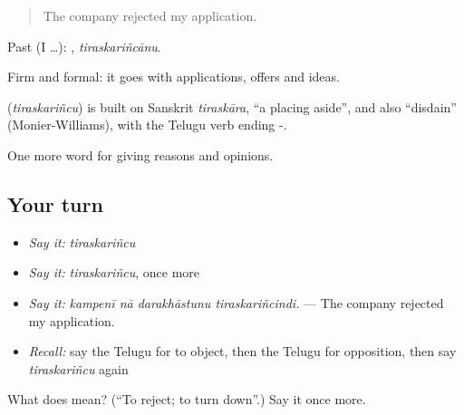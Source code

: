 \begin{quote}
The company rejected my application.
\end{quote}

Past (I …): , \emph{tiraskariñcānu}.

Firm and formal: it goes with applications, offers and ideas.

\begin{cousinweb}
\textbf{} (\emph{tiraskariñcu}) is built on Sanskrit \emph{tiraskāra}, \textquotedblleft{}a placing aside\textquotedblright{}, and also \textquotedblleft{}disdain\textquotedblright{} (Monier-Williams), with the Telugu verb ending -.
\end{cousinweb}

\begin{grammarlens}[title={What you've built}]
One more word for giving reasons and opinions.
\end{grammarlens}

\subsection*{Your turn}
\begin{itemize}
\raggedright
  \item \emph{Say it:} \emph{tiraskariñcu}
  \item \emph{Say it:} \emph{tiraskariñcu}, once more
  \item \emph{Say it:} \emph{kampenī nā darakhāstunu tiraskariñcindi.} — The company rejected my application.
  \item \emph{Recall:} say the Telugu for to object, then the Telugu for opposition, then say \emph{tiraskariñcu} again
\end{itemize}

\begin{tcolorbox}[breakable,colback=teal!4,colframe=teal!35!black,title={Before you move on}]
What does  mean? (\textquotedblleft{}To reject; to turn down\textquotedblright{}.) Say it once more.
\end{tcolorbox}
